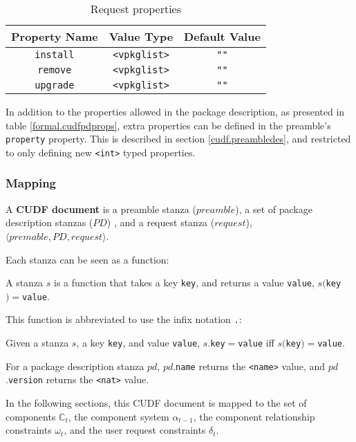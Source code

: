 \begin{table}
\begin{tabular}{|c|c|c|}
Property Name & Value Type & Default Value \\ \hline
\texttt{install} & \verb+<vpkglist>+ & \verb+""+ \\ 
\texttt{remove} & \verb+<vpkglist>+ & \verb+""+ \\ 
\texttt{upgrade} & \verb+<vpkglist>+ & \verb+""+ \\ 
\end{tabular}
\caption{Request properties}
\label{formal.cudfrequestprops}
\end{table}

In addition to the properties allowed in the package description, as presented in table \ref{formal.cudfpdprops}, extra properties can be defined in the preamble's \texttt{property} property.
This is described in section \ref{cudf.preambledes}, and restricted to only defining new \texttt{<int>} typed properties.

\subsubsection{Mapping}

\begin{defs}
A \textbf{CUDF document} is a preamble stanza ($preamble$), a set of package description stanzas ($PD$) , and a request stanza ($request$), $\langle premable, PD, request \rangle$.
\end{defs}

Each stanza can be seen as a function:
\begin{defs}
A stanza $s$ is a function that takes a key \texttt{key}, and returns a value \texttt{value}, $s($\texttt{key}$) = $\texttt{value}. 
\end{defs}

This function is abbreviated to use the infix notation \texttt{.}:
\begin{defs}
Given a stanza $s$, a key \texttt{key}, and value \texttt{value}, $s$.\texttt{key}$ = $\texttt{value} iff $s($\texttt{key}$) = $\texttt{value}.
\end{defs}
For a package description stanza $pd$, $pd$.\texttt{name} returns the \texttt{<name>} value,
and $pd$.\texttt{version} returns the \texttt{<nat>} value.

In the following sections, this CUDF document is mapped to the set of components $\mathbb{C}_t$, the component system $\alpha_{t-1}$,
the component relationship constraints $\omega_t$, and the user request constraints $\delta_t$.

